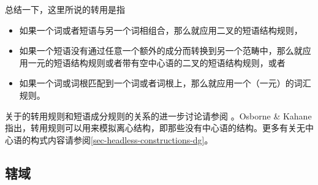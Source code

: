 总结一下，这里所说的转用是指
\begin{itemize}
\item 如果一个词或者短语与另一个词相组合，那么就应用二叉的短语结构规则，
\item 如果一个短语没有通过任意一个额外的成分而转换到另一个范畴中，那么就应用一元的短语结构规则或者带有空中心语的二叉的短语结构规则，或者
\item 如果一个词或词根匹配到一个词或者词根上，那么就应用一个（一元）的词汇规则。
\end{itemize}
关于\tes 的转用规则和短语成分规则的关系的进一步讨论请参阅 。Osborne \& Kahane指出，转用规则可以用来模拟离心结构，即那些没有中心语的结构。更多有关无中心语的构式内容请参阅\ref{sec-headless-constructions-dg}。

\subsection{辖域}

